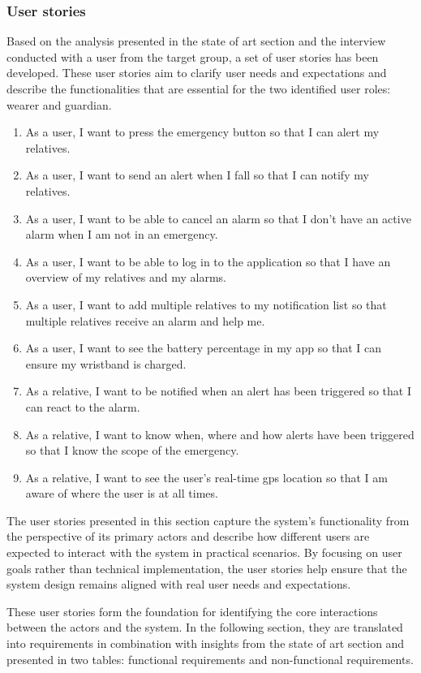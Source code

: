 \subsubsection{User stories}
Based on the analysis presented in the state of art section and the interview conducted with a user from the target group, a set of user stories has been developed. These user stories aim to clarify user needs and expectations and describe the functionalities that are essential for the two identified user roles: wearer and guardian.

\begin{enumerate}
    \item As a user, I want to press the emergency button so that I can alert my relatives. 
    \item As a user, I want to send an alert when I fall so that I can notify my relatives. 
    \item As a user, I want to be able to cancel an alarm so that I don't have an active alarm when I am not in an emergency.
    \item As a user, I want to be able to log in to the application so that I have an overview of my relatives and my alarms.
    \item As a user, I want to add multiple relatives to my notification list so that multiple relatives receive an alarm and help me. 
    \item As a user, I want to see the battery percentage in my app so that I can ensure my wristband is charged. 
    \item As a relative, I want to be notified when an alert has been triggered so that I can react to the alarm.
    \item As a relative, I want to know when, where and how alerts have been triggered so that I know the scope of the emergency.
    \item As a relative, I want to see the user's real-time \gls{gps} location so that I am aware of where the user is at all times.
    
\end{enumerate}

The user stories presented in this section capture the system’s functionality from the perspective of its primary actors and describe how different users are expected to interact with the system in practical scenarios. By focusing on user goals rather than technical implementation, the user stories help ensure that the system design remains aligned with real user needs and expectations.

These user stories form the foundation for identifying the core interactions between the actors and the system. In the following section, they are translated into requirements in combination with insights from the state of art section and presented in two tables: functional requirements and non-functional requirements.

